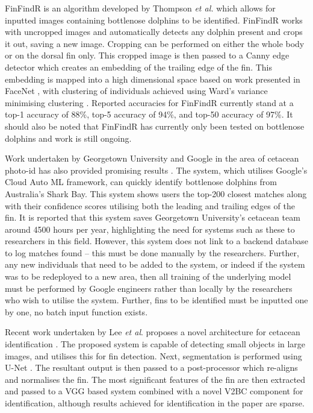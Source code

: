 FinFindR is an algorithm developed by Thompson \textit{et al.} \cite{thompson_finfindr_2022} which allows for inputted images containing bottlenose dolphins to be identified. FinFindR works with uncropped images and automatically detects any dolphin present and crops it out, saving a new image. Cropping can be performed on either the whole body or on the dorsal fin only. This cropped image is then passed to a Canny edge detector which creates an embedding of the trailing edge of the fin. This embedding is mapped into a high dimensional space based on work presented in FaceNet \cite{schroff_facenet_2015}, with clustering of individuals achieved using Ward's variance minimising clustering \cite{ward_hierarchical_1963}. Reported accuracies for FinFindR currently stand at a top-1 accuracy of 88\%, top-5 accuracy of 94\%, and top-50 accuracy of 97\%. It should also be noted that FinFindR has currently only been tested on bottlenose dolphins and work is still ongoing.

Work undertaken by Georgetown University and Google in the area of cetacean photo-id has also provided promising results \cite{georgetown_university_is_2018}. The system, which utilises Google's Cloud Auto ML framework, can quickly identify bottlenose dolphins from Australia's Shark Bay. This system shows users the top-200 closest matches along with their confidence scores utilising both the leading and trailing edges of the fin. It is reported that this system saves Georgetown University's cetacean team around 4500 hours per year, highlighting the need for systems such as these to researchers in this field. However, this system does not link to a backend database to log matches found -- this must be done manually by the researchers. Further, any new individuals that need to be added to the system, or indeed if the system was to be redeployed to a new area, then all training of the underlying model must be performed by Google engineers rather than locally by the researchers who wish to utilise the system. Further, fins to be identified must be inputted one by one, no batch input function exists.  

Recent work undertaken by Lee \textit{et al}. proposes a novel architecture for cetacean identification \cite{lee_backbone_2020}. The proposed system is capable of detecting small objects in large images, and utilises this for fin detection. Next, segmentation is performed using U-Net \cite{ronneberger_u-net_2015}. The resultant output is then passed to a post-processor which re-aligns and normalises the fin. The most significant features of the fin are then extracted and passed to a VGG based system \cite{simonyan_very_2015} combined with a novel V2BC component for identification, although results achieved for identification in the paper are sparse.

